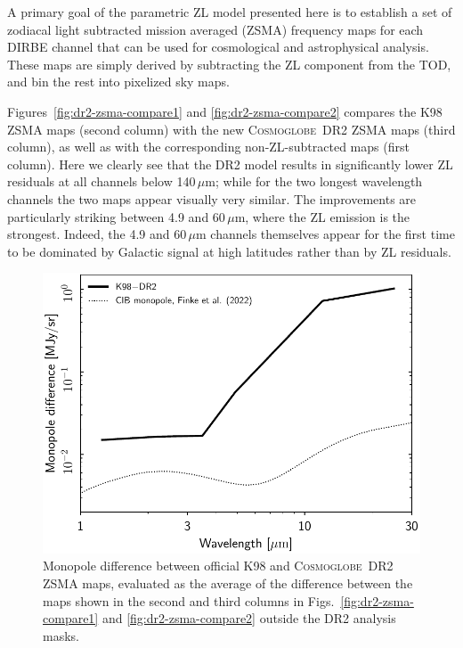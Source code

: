 \documentclass[twocolumn]{aa}
\newcommand{\cosmoglobe}{\textsc{Cosmoglobe}}
\begin{document}
A primary goal of the parametric ZL model presented here is to
establish a set of zodiacal light subtracted mission averaged (ZSMA)
frequency maps for each DIRBE channel that can be used for
cosmological and astrophysical analysis. These maps are simply derived
by subtracting the ZL component from the TOD, and bin the rest
into pixelized sky maps.

Figures~\ref{fig:dr2-zsma-compare1} and \ref{fig:dr2-zsma-compare2}
compares the K98 ZSMA maps (second column) with the new
\cosmoglobe\ DR2 ZSMA maps (third column), as well as with the
corresponding non-ZL-subtracted maps (first column). Here we clearly
see that the DR2 model results in significantly lower ZL residuals at
all channels below 140\,$\mu$m; while for the two longest wavelength
channels the two maps appear visually very similar. The improvements
are particularly striking between 4.9 and 60$\,\mu$m, where the ZL
emission is the strongest. Indeed, the 4.9 and 60$\,\mu$m channels
themselves appear for the first time to be dominated by Galactic
signal at high latitudes rather than by ZL residuals.

\begin{figure}
    \centering
    \includegraphics[width=\linewidth]{figs/zodi_mean_diff_DIRBE_DR2_v4.pdf}
    \caption{Monopole difference between official K98 and
      \cosmoglobe\ DR2 ZSMA maps, evaluated as the average of the
      difference between the maps shown in the second and third
      columns in Figs.~\ref{fig:dr2-zsma-compare1} and
      \ref{fig:dr2-zsma-compare2} outside the DR2 analysis masks.}
    \label{fig:zsma_mean}
\end{figure}
\end{document}
